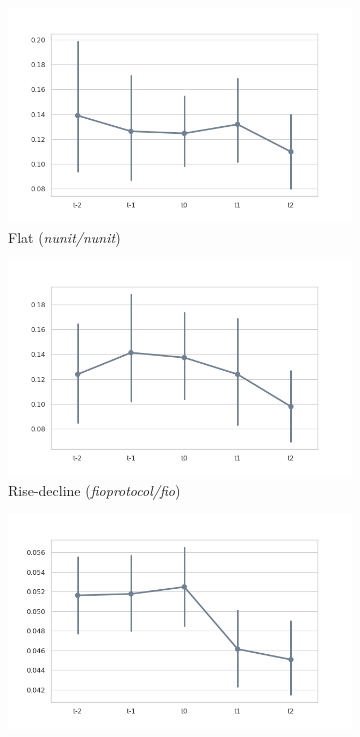 \begin{figure}[!htbp]
    \centering
    \begin{subfigure}{0.49\textwidth}
        \centering
        \includegraphics[width=\textwidth]{figures/quantitative/pointplots/nunit_nunit.png}
        \caption{Flat (\textit{nunit/nunit})}
        \label{fig:mean-path-pattern1}
    \end{subfigure}
    \begin{subfigure}{0.49\textwidth}
        \centering
        \includegraphics[width=\textwidth]{figures/quantitative/pointplots/stack-of-tasks_pinocchio.png}
        \caption{Rise-decline (\textit{fioprotocol/fio})}
        \label{fig:mean-path-pattern2}
    \end{subfigure}
    \begin{subfigure}{0.49\textwidth}
        \centering
        \includegraphics[width=\textwidth]{figures/quantitative/pointplots/frappe_erpnext.png}

\end{subfigure}
\end{figure}
